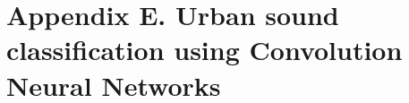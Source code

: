 \chapter{Appendix E. Urban sound classification using Convolution Neural Networks}
\label{app:urban_sound}

\cite{piczak2015environmental}
